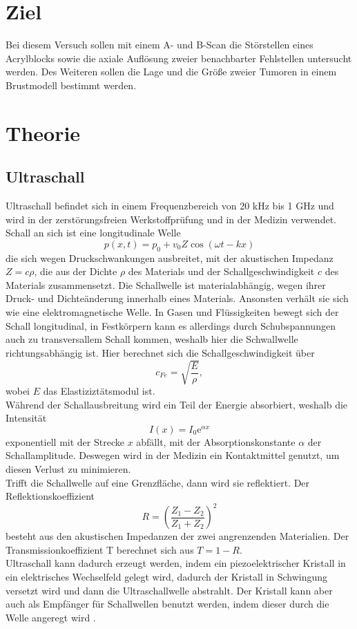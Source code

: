\section{Ziel}
Bei diesem Versuch sollen mit einem A- und B-Scan die Störstellen eines Acrylblocks sowie die axiale Auflösung zweier benachbarter Fehlstellen untersucht werden. Des Weiteren sollen die Lage und die Größe zweier Tumoren in einem Brustmodell bestimmt werden. 

\section{Theorie}
\label{sec:Theorie}
\subsection{Ultraschall}
Ultraschall befindet sich in einem Frequenzbereich von 20 kHz bis 1 GHz und wird in der zerstörungsfreien Werkstoffprüfung und in der Medizin verwendet. Schall an sich ist eine longitudinale Welle
\begin{equation*}
  p(x,t)=p_0+v_0 Z \cos(\omega t-kx)
\end{equation*}
die sich wegen Druckschwankungen ausbreitet, mit der akustischen Impedanz $Z=c\rho$, die aus der Dichte $\rho$ des Materials und der Schallgeschwindigkeit $c$ des Materials zusammensetzt. Die Schallwelle ist materialabhängig, wegen ihrer Druck- und Dichteänderung innerhalb eines Materials. Ansonsten verhält sie sich wie eine elektromagnetische Welle. In Gasen und Flüssigkeiten bewegt sich der Schall longitudinal, in Festkörpern kann es allerdings durch Schubspannungen auch zu transversallem Schall kommen, weshalb hier die Schwallwelle richtungsabhängig ist. Hier berechnet sich die Schallgeschwindigkeit über
\begin{equation*}
  c_{Fe}=\sqrt{\frac{E}{\rho}},
\end{equation*}
wobei $E$ das Elastiziztätsmodul ist.\\
Während der Schallausbreitung wird ein Teil der Energie absorbiert, weshalb die Intensität
\begin{equation*}
  I(x)=I_0 \textrm{e}^{\alpha x}
\end{equation*} 
exponentiell mit der Strecke $x$ abfällt, mit der Absorptionskonstante $\alpha$ der Schallamplitude. Deswegen wird in der Medizin ein Kontaktmittel genutzt, um diesen Verlust zu minimieren.\\
Trifft die Schallwelle auf eine Grenzfläche, dann wird sie reflektiert. Der Reflektionskoeffizient
\begin{equation*}
  R=\left(\frac{Z_1-Z_2}{Z_1+Z_2}\right)^2
\end{equation*}
besteht aus den akustischen Impedanzen der zwei angrenzenden Materialien. Der Transmissionkoeffizient T berechnet sich aus $T=1-R$.\\
Ultraschall kann dadurch erzeugt werden, indem ein piezoelektrischer Kristall in ein elektrisches Wechselfeld gelegt wird, dadurch der Kristall in Schwingung versetzt wird und dann die Ultraschallwelle abstrahlt. Der Kristall kann aber auch als Empfänger für Schallwellen benutzt werden, indem dieser durch die Welle angeregt wird \cite{1}.

